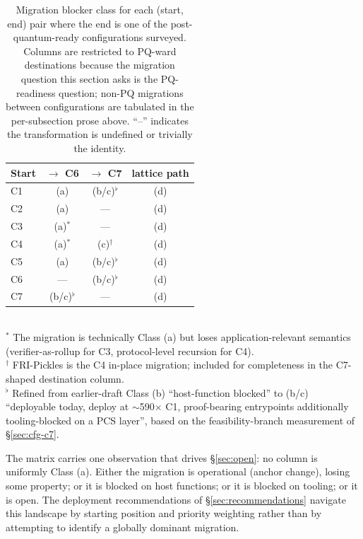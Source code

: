 \begin{table}[t]
  \centering
  \caption{Migration blocker class for each (start, end) pair where
    the end is one of the post-quantum-ready configurations
    surveyed. Columns are restricted to PQ-ward destinations because
    the migration question this section asks is the PQ-readiness
    question; non-PQ migrations between configurations are tabulated
    in the per-subsection prose above. ``--'' indicates the
    transformation is undefined or trivially the identity.}
  \label{tab:migration}
  \begin{tabular}{lccc}
    \toprule
    Start & $\to$ C6 & $\to$ C7 & lattice path \\
    \midrule
    C1 & (a) & (b/c)$^\flat$ & (d) \\
    C2 & (a) & ---  & (d) \\
    C3 & (a)$^\ast$ & --- & (d) \\
    C4 & (a)$^\ast$ & (c)$^\dagger$ & (d) \\
    C5 & (a) & (b/c)$^\flat$ & (d) \\
    C6 & ---  & (b/c)$^\flat$ & (d) \\
    C7 & (b/c)$^\flat$ & ---  & (d) \\
    \bottomrule
  \end{tabular}
  \\[0.5em]
  \footnotesize
  $^\ast$ The migration is technically Class (a) but loses
    application-relevant semantics (verifier-as-rollup for C3,
    protocol-level recursion for C4). \\
  $^\dagger$ FRI-Pickles is the C4 in-place migration; included
    for completeness in the C7-shaped destination column. \\
  $^\flat$ Refined from earlier-draft Class (b) ``host-function
    blocked'' to (b/c) ``deployable today, deploy at $\sim$590$\times$
    C1, proof-bearing entrypoints additionally tooling-blocked on a
    PCS layer'', based on the feasibility-branch measurement of
    \S\ref{sec:cfg-c7}.
\end{table}

The matrix carries one observation that drives \S\ref{sec:open}: no
column is uniformly Class (a). Either the migration is operational
(anchor change), losing some property; or it is blocked on host
functions; or it is blocked on tooling; or it is open. The
deployment recommendations of \S\ref{sec:recommendations} navigate
this landscape by starting position and priority weighting rather
than by attempting to identify a globally dominant migration.
